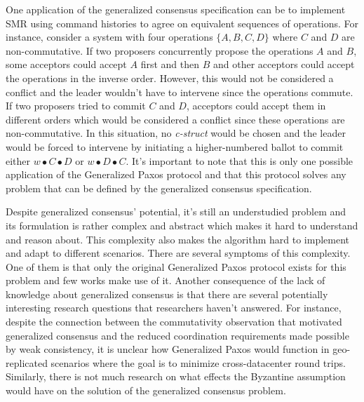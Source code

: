One application of the generalized consensus specification can be to implement SMR using command histories to agree on equivalent sequences of operations. For instance, consider a system with four operations $\{A, B, C, D\}$ where $C$ and $D$ are non-commutative. If two proposers concurrently propose the operations $A$ and $B$, some acceptors could accept $A$ first and then $B$ and other acceptors could accept the operations in the inverse order. However, this would not be considered a conflict and the leader wouldn't have to intervene since the operations commute. If two proposers tried to commit $C$ and $D$, acceptors could accept them in different orders which would be considered a conflict since these operations are non-commutative. In this situation, no \textit{c-struct} would be chosen and the leader would be forced to intervene by initiating a higher-numbered ballot to commit either $w \bullet C \bullet D$ or $w \bullet D \bullet C$. It's important to note that this is only one possible application of the Generalized Paxos protocol and that this protocol solves any problem that can be defined by the generalized consensus specification. \par
\iffalse{\color{red} If this is already mentioned in the discussion section, remove from intro}
The approach of allowing the system to reorder operations may feel familiar to the reader, since it resembles how weak consistency models relax consistency guarantees to allow replicas to reorder operations \cite{Ladin1992}. By relaxing consistency and allowing operations to be reordered, these models reduce coordination requirements which results in decreased latency and better operation concurrency. However, relaxing consistency guarantees also introduces the chance of state divergence which can be tolerable or not depending on the application. These approaches are critical to geo-replicated scenarios where it's important to reduce round trips between data centers and maintaining strong consistency incurs in an unacceptable latency cost. \par\fi
Despite generalized consensus' potential, it's still an understudied problem and its formulation is rather complex and abstract which makes it hard to understand and reason about. This complexity also makes the algorithm hard to implement and adapt to different scenarios. There are several symptoms of this complexity. One of them is that only the original Generalized Paxos protocol exists for this problem and few works make use of it. Another consequence of the lack of knowledge about generalized consensus is that there are several potentially interesting research questions that researchers haven't answered. For instance, despite the connection between the commutativity observation that motivated generalized consensus and the reduced coordination requirements made possible by weak consistency, it is unclear how Generalized Paxos would function in geo-replicated scenarios where the goal is to minimize cross-datacenter round trips. Similarly, there is not much research on what effects the Byzantine assumption would have on the solution of the generalized consensus problem.
\par

